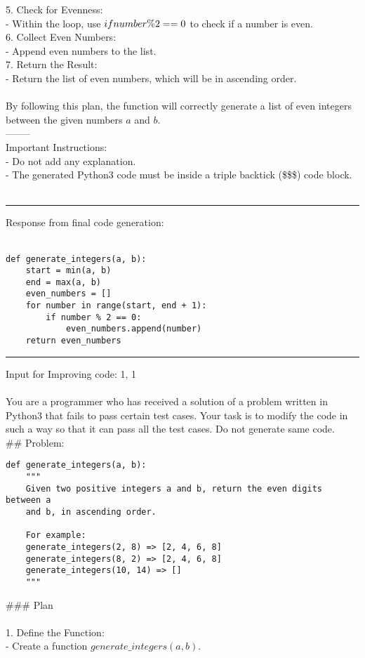 5. \*\*Check for Evenness:\*\* \\
   - Within the loop, use $if  \space number \% 2 == 0$ to check if a number is even. \\

6. \*\*Collect Even Numbers:\*\* \\
   - Append even numbers to the list. \\

7. \*\*Return the Result:\*\* \\
   - Return the list of even numbers, which will be in ascending order. \\
 \\
By following this plan, the function will correctly generate a list of even integers between the given numbers $a$ and $b$. \\

-------- \\
\*\*Important Instructions:\*\* \\
- Do not add any explanation. \\
- The generated \*\*Python3\*\* code must be inside a triple backtick (\$\$\$) code block. \\ \\



\vspace{0.5cm} \hrule   \vspace{0.5cm}
Response from final code generation: \\
 \\

\begin{verbatim}
def generate_integers(a, b):
    start = min(a, b)
    end = max(a, b)
    even_numbers = []
    for number in range(start, end + 1):
        if number % 2 == 0:
            even_numbers.append(number)
    return even_numbers
\end{verbatim}


\vspace{0.5cm} \hrule   \vspace{0.5cm}
Input for Improving code: 1, 1 \\
 \\
You are a programmer who has received a solution of a problem written in \*\*Python3\*\* that fails to pass certain test cases. Your task is to modify the code in such a way so that it can pass all the test cases. Do not generate same code. \\

\#\# Problem: \\
\begin{verbatim}
def generate_integers(a, b):
    """
    Given two positive integers a and b, return the even digits between a
    and b, in ascending order.

    For example:
    generate_integers(2, 8) => [2, 4, 6, 8]
    generate_integers(8, 2) => [2, 4, 6, 8]
    generate_integers(10, 14) => []
    """
\end{verbatim}
\#\#\# Plan \\
 \\
1. \*\*Define the Function:\*\* \\
   - Create a function $generate\_integers(a, b)$. \\

